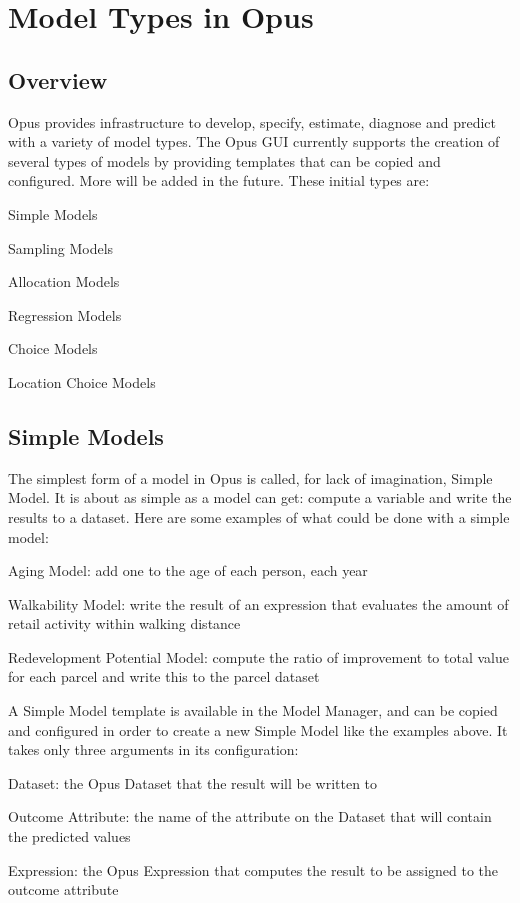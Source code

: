 \chapter{Model Types in Opus}
\label{chap:creating-models}
\section{Overview}

Opus provides infrastructure to develop, specify, estimate,
diagnose and predict with a variety of model types.  The
Opus GUI currently supports the creation of several types of
models by providing templates that can be copied and
configured. More will be added in the future.  These initial
types are:

\squishlist
\item Simple Models
\item Sampling Models
\item Allocation Models
\item Regression Models
\item Choice Models
\item Location Choice Models
\squishend 

\section{Simple Models}
%
\label{sec:components-simple-model}
%
The simplest form of a model in Opus is called, for lack of
imagination, Simple Model.  It is about as simple as a model
can get: compute a variable and write the results to a
dataset.  Here are some examples of what could be done with
a simple model:

\squishlist
\item Aging Model: add one to the age of each person, each
  year
\item Walkability Model: write the result of an expression
  that evaluates the amount of retail activity within
  walking distance
\item Redevelopment Potential Model: compute the ratio of
  improvement to total value for each parcel and write this
  to the parcel dataset \squishend

  A Simple Model template is available in the Model Manager,
  and can be copied and configured in order to create a new
  Simple Model like the examples above. It takes only three
  arguments in its configuration:

\squishlist
\item Dataset: the Opus Dataset that the result will be
  written to
\item Outcome Attribute: the name of the attribute on the
  Dataset that will contain the predicted values
\item Expression: the Opus Expression that computes the
  result to be assigned to the outcome attribute \squishend

